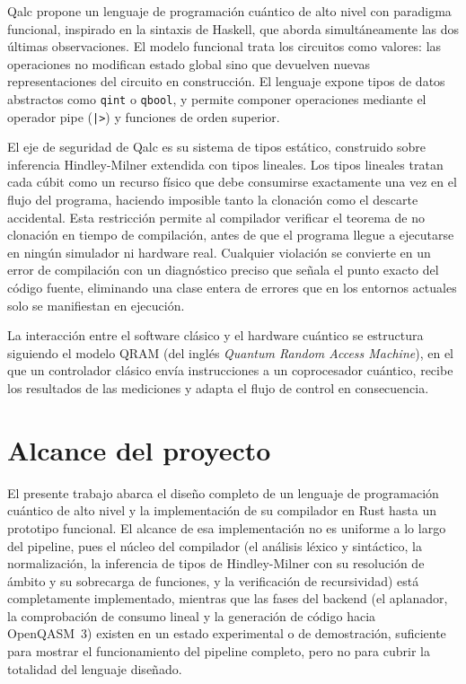 Qalc propone un lenguaje de programación cuántico de alto nivel con paradigma funcional, inspirado en la sintaxis de Haskell, que aborda simultáneamente las dos últimas observaciones. El modelo funcional trata los circuitos como valores: las operaciones no modifican estado global sino que devuelven nuevas representaciones del circuito en construcción. El lenguaje expone tipos de datos abstractos como \lstinline|qint| o \lstinline|qbool|, y permite componer operaciones mediante el operador pipe (\lstinline{|>}) y funciones de orden superior.

El eje de seguridad de Qalc es su sistema de tipos estático, construido sobre inferencia Hindley-Milner extendida con tipos lineales. Los tipos lineales tratan cada cúbit como un recurso físico que debe consumirse exactamente una vez en el flujo del programa, haciendo imposible tanto la clonación como el descarte accidental. Esta restricción permite al compilador verificar el teorema de no clonación en tiempo de compilación, antes de que el programa llegue a ejecutarse en ningún simulador ni hardware real. Cualquier violación se convierte en un error de compilación con un diagnóstico preciso que señala el punto exacto del código fuente, eliminando una clase entera de errores que en los entornos actuales solo se manifiestan en ejecución.

La interacción entre el software clásico y el hardware cuántico se estructura siguiendo el modelo QRAM (del inglés \textit{Quantum Random Access Machine}), en el que un controlador clásico envía instrucciones a un coprocesador cuántico, recibe los resultados de las mediciones y adapta el flujo de control en consecuencia.

\section{Alcance del proyecto}
\label{sec:alcance}

El presente trabajo abarca el diseño completo de un lenguaje de programación cuántico de alto nivel y la implementación de su compilador en Rust hasta un prototipo funcional. El alcance de esa implementación no es uniforme a lo largo del pipeline, pues el núcleo del compilador (el análisis léxico y sintáctico, la normalización, la inferencia de tipos de Hindley-Milner con su resolución de ámbito y su sobrecarga de funciones, y la verificación de recursividad) está completamente implementado, mientras que las fases del backend (el aplanador, la comprobación de consumo lineal y la generación de código hacia OpenQASM~3) existen en un estado experimental o de demostración, suficiente para mostrar el funcionamiento del pipeline completo, pero no para cubrir la totalidad del lenguaje diseñado.

